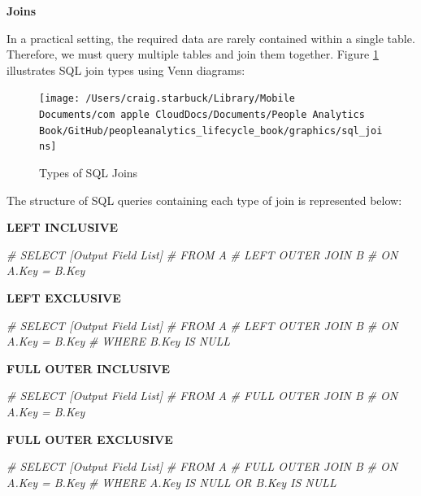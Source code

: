 \documentclass[]{book}
\newenvironment{Shaded}{\begin{snugshade}}{\end{snugshade}}
\newcommand{\CommentTok}[1]{\textcolor[rgb]{0.56,0.35,0.01}{\textit{#1}}}
\begin{document}
\textbf{Joins}

In a practical setting, the required data are rarely contained within a single table. Therefore, we must query multiple tables and join them together. Figure \ref{fig:sql-joins} illustrates SQL join types using Venn diagrams:

\begin{figure}

{\centering \texttt{[image: /Users/craig.starbuck/Library/Mobile Documents/com~apple~CloudDocs/Documents/People Analytics Book/GitHub/peopleanalytics\_lifecycle\_book/graphics/sql\_joins]} 

}

\caption{Types of SQL Joins}\label{fig:sql-joins}
\end{figure}

The structure of SQL queries containing each type of join is represented below:

\textbf{LEFT INCLUSIVE}

\begin{Shaded}
\begin{Highlighting}[]
\CommentTok{#  SELECT [Output Field List]}
\CommentTok{#  FROM A }
\CommentTok{#  LEFT OUTER JOIN B}
\CommentTok{#  ON A.Key = B.Key}
\end{Highlighting}
\end{Shaded}

\textbf{LEFT EXCLUSIVE}

\begin{Shaded}
\begin{Highlighting}[]
\CommentTok{#  SELECT [Output Field List]}
\CommentTok{#  FROM A }
\CommentTok{#  LEFT OUTER JOIN B}
\CommentTok{#  ON A.Key = B.Key}
\CommentTok{#  WHERE B.Key IS NULL}
\end{Highlighting}
\end{Shaded}

\textbf{FULL OUTER INCLUSIVE}

\begin{Shaded}
\begin{Highlighting}[]
\CommentTok{#  SELECT [Output Field List]}
\CommentTok{#  FROM A }
\CommentTok{#  FULL OUTER JOIN B}
\CommentTok{#  ON A.Key = B.Key}
\end{Highlighting}
\end{Shaded}

\textbf{FULL OUTER EXCLUSIVE}

\begin{Shaded}
\begin{Highlighting}[]
\CommentTok{#  SELECT [Output Field List]}
\CommentTok{#  FROM A }
\CommentTok{#  FULL OUTER JOIN B}
\CommentTok{#  ON A.Key = B.Key}
\CommentTok{#  WHERE A.Key IS NULL OR B.Key IS NULL  }
\end{Highlighting}
\end{Shaded}
\end{document}
